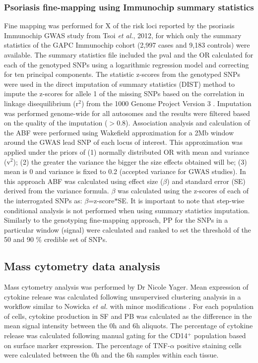 \subsubsection{Psoriasis fine-mapping using Immunochip summary statistics}
Fine mapping was performed for X of the risk loci reported by the psoriasis Immunochip GWAS study from Tsoi \textit{et al.}, 2012, for which only the summary statistics of the GAPC Immunochip cohort (2,997 cases and 9,183 controls) were available. The summary statistics file included the pval and the OR calculated for each of the genotyped SNPs using a logarithmic regression model and correcting for ten principal components. The statistic z-scores from the genotyped SNPs were used in the direct imputation of summary statistics (DIST) method to impute the z-scores for allele 1 of the missing SNPs based on the correlation in linkage disequilibrium (r$^2$) from the 1000 Genome Project Version 3 \parencite{Lee2013}. Imputation was performed genome-wide for all autosomes and the results were filtered based on the quality of the imputation ($>$0.8). Association analysis and calculation of the ABF were performed using Wakefield approximation for a 2Mb window around the GWAS lead SNP of each locus of interest. This approximation was applied under the priors of (1) normally distributed OR with mean and variance (v$^2$); (2) the greater the variance the bigger the size effects obtained will be; (3) mean is 0 and variance is fixed to 0.2 (accepted variance for GWAS studies). In this approach ABF was calculated using effect size ($\beta$) and standard error (SE) derived from the variance formula. $\beta$ was calculated using the z-scores of each of the interrogated SNPs as: $\beta$=z-score$\ast$SE. It is important to note that step-wise conditional analysis is not performed when using summary statistics imputation. Similarly to the genotyping fine-mapping approach, PP for the SNPs in a particular window (signal) were calculated and ranked to set the threshold of the 50 and 90 \% credible set of SNPs. 

\subsection{Mass cytometry data analysis}
Mass cytometry analysis was performed by Dr Nicole Yager. Mean expression of cytokine release was calculated following unsupervised clustering analysis in a workflow similar to Nowicka \textit{et al.} with minor modifications \parencite{Nowicka 2017}. For each population of cells, cytokine production in SF and PB was calculated as the difference in the mean signal intensity between the 0h and 6h aliquots. The percentage of cytokine release was calculated following manual gating for the CD14$^+$ population based on surface marker expression.  The percentage of TNF-$\alpha$ positive staining cells were calculated between the 0h and the 6h samples within each tissue.
